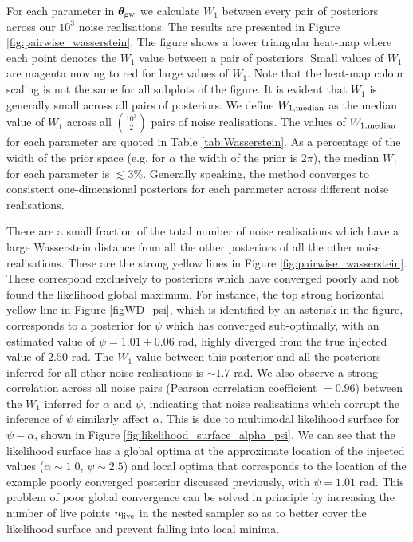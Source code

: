 \documentclass[fleqn,usenatbib,useAMS]{mnras}
\begin{document}
For each parameter in $\boldsymbol{\theta}_{\rm gw}$ we calculate $W_1$ between every pair of posteriors across our $10^3$ noise realisations. The results are presented in Figure \ref{fig:pairwise_wasserstein}. The figure shows a lower triangular heat-map where each point denotes the $W_1$ value between a pair of posteriors. Small values of $W_1$ are magenta moving to red for large values of $W_1$. Note that the heat-map colour scaling is not the same for all subplots of the figure. It is evident that $W_1$ is generally small across all pairs of posteriors. We define $W_{1, \rm median}$ as the median value of $W_1$ across all $10^3 \choose 2$ pairs of noise realisations. The values of $W_{1, \rm median}$ for each parameter are quoted in Table \ref{tab:Wasserstein}. As a percentage of the width of the prior space (e.g. for $\alpha$ the width of the prior is $2 \pi$), the median $W_1$ for each parameter is $\lesssim 3 \%$. Generally speaking, the method converges to consistent one-dimensional posteriors for each parameter across different noise realisations. \newline


There are a small fraction of the total number of noise realisations which have a large Wasserstein distance from all the other posteriors of all the other noise realisations. These are the strong yellow lines in Figure \ref{fig:pairwise_wasserstein}. These correspond exclusively to posteriors which have converged poorly and not found the likelihood global maximum. For instance, the top strong horizontal yellow line in Figure \ref{figWD_psi}, which is identified by an asterisk in the figure, corresponds to a posterior for $\psi$ which has converged sub-optimally, with an estimated value of $\psi = 1.01 \pm 0.06$ rad, highly diverged from the true injected value of $2.50$ rad. The $W_1$ value between this posterior and all the posteriors inferred for all other noise realisations is $\sim 1.7$ rad. We also observe a strong correlation across all noise pairs (Pearson correlation coefficient $=0.96$) between the $W_1$ inferred for $\alpha$ and $\psi$, indicating that noise realisations which corrupt the inference of $\psi$ similarly affect $\alpha$. This is due to multimodal likelihood surface for $\psi-\alpha$, shown in Figure \ref{fig:likelihood_surface_alpha_psi}. We can see that the likelihood surface has a global optima at the approximate location of the injected values ($\alpha \sim 1.0$, $\psi\sim2.5$) and local optima that corresponds to the location of the example poorly converged posterior discussed previously, with $\psi = 1.01$ rad. This problem of poor global convergence can be solved in principle by increasing the number of live points $n_{\rm live}$ in the nested sampler so as to better cover the likelihood surface and prevent falling into local minima. 
\end{document}
